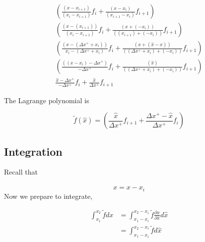\documentclass[12pt]{article}
\begin{document}
\begin{align*}
    \left( \frac{
            \left( x - x_{i+1} \right)
            }{
            \left( x_i - x_{i+1} \right)
        }
        f_i
        + \frac{
            \left( x - x_i  \right)
            }{
            \left(x_{i+1}- x_i \right)
        }
        f_{i+1}
    \right) \\
    \left( 
        \frac{
            \left( x - \left( x_{i+1} \right) \right)
            }{
            \left( x_i - x_{i+1}\right)
        } 
        f_i + 
        \frac{
            \left( x + \left( -x_i \right) \right)
            }{
            \left( \left( x_{i+1} \right) + \left( -x_i \right) \right)
        }
        f_{i+1}
    \right) \\
    \left(
        \frac{
            (x-\left( \Delta x^+ + x_i \right)) 
            }{
            x_i - (\Delta x^+ + x_i)
        }
        f_i
        +
        \frac{ 
            \left( x + \left( \hat{x} - x \right) \right)
            }{
            \left( \left( \Delta x^+ + x_i \right) + \left( -x_i \right) \right)
        }
        f_{i+1}
    \right)  \\
    \left(
        \frac{
            (\left(x-x_i  \right) -\Delta x^+)   
            }{ 
            - \Delta x^+ 
        }
        f_i
        +
        \frac{
            \left(   \hat{x}    \right)
            }{\left( \left(  \Delta x^+ + x_i \right)  + \left( -x_i \right) \right)
        } f_{i+1}
    \right) \\
    \frac{
        \hat{x} - \Delta x^+
        }{
        -\Delta x^+
    }
    f_i
    +
    \frac{
        \hat{x}
        }{
        \Delta x^+
    }
    f_{i+1}
\end{align*}

The Lagrange polynomial is

\begin{equation*}
    \widetilde{f}\left( \hat{x} \right) 
    =
    \left( 
        \frac{\hat{x}}{\Delta x^+}f_{i+1} +
        \frac{\Delta x^+ - \hat{x}}{\Delta x^+}f_i
    \right)
\end{equation*}

\subsection{Integration}

Recall that 

\[ \hat{x} = x - x_i\]
Now we prepare to integrate,

\begin{align*}
    \int_{x_1}^{x_2} \widetilde{f} dx &=
    \int_{x_1-x_i}^{x_2-x_i} \widetilde{f} \frac{\partial x}{\partial \hat{x}}d\hat{x}\\
                                      &=
                                      \int_{x_1-x_i}^{x_2 - x_i} \widetilde{f} d\hat{x}
\end{align*}
\end{document}
